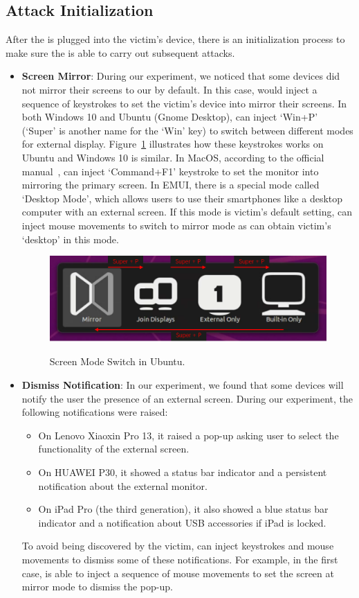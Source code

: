 \subsection{Attack Initialization}
\label{subsec:attack_init}
After the \tool is plugged into the victim's device, there is an initialization process to make sure the \tool is able to carry out subsequent attacks.
\begin{itemize}
	\item \textbf{Screen Mirror}:
		During our experiment, we noticed that some devices did not mirror their screens to our \tool by default. In this case, \tool would inject a sequence of keystrokes to set the victim's device into mirror their screens. In both Windows 10 and Ubuntu (Gnome Desktop), \tool can inject `Win+P' (`Super' is another name for the `Win' key) to switch between different modes for external display. Figure~\ref{fig:ubuntu_switch} illustrates how these keystrokes works on Ubuntu and Windows 10 is similar. In MacOS, according to the official manual~\cite{appleman}, \tool can inject \mbox{`Command+F1'} keystroke to set the monitor into mirroring the primary screen. In EMUI, there is a special mode called `Desktop Mode', which allows users to use their smartphones like a desktop computer with an external screen. If this mode is victim's default setting, \tool can inject mouse movements to switch to mirror mode as \tool can obtain victim's `desktop' in this mode.
		\begin{figure}[H]
			\includegraphics[width=\linewidth]{./Figs/ubuntu_switch.png}\\
			\caption{Screen Mode Switch in Ubuntu.}
			\label{fig:ubuntu_switch}
		\end{figure}
	\item \textbf{Dismiss Notification}:
		In our experiment, we found that some devices will notify the user the presence of an external screen. During our experiment, the following notifications were raised:
		\begin{itemize}
		 \item On Lenovo Xiaoxin Pro 13, it raised a pop-up asking user to select the functionality of the external screen.
		 \item On HUAWEI P30, it showed a status bar indicator and a persistent notification about the external monitor.
		 \item On iPad Pro (the third generation), it also showed a blue status bar indicator and a notification about \ac{USB} accessories if iPad is locked.
		\end{itemize}
		To avoid being discovered by the victim, \tool can inject keystrokes and mouse movements to dismiss some of these notifications. For example, in the first case, \tool is able to inject a sequence of mouse movements to set the screen at mirror mode to dismiss the pop-up.
\end{itemize}
